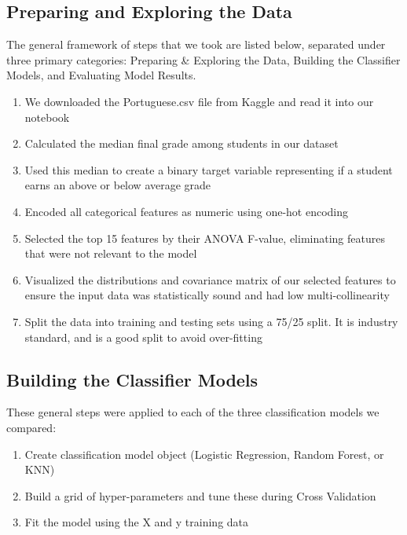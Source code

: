 \documentclass[twoside,twocolumn]{article}
\begin{document}
\subsection{Preparing and Exploring the Data}
The general framework of steps that we took are listed below, separated under three primary categories: Preparing \& Exploring the Data, Building the Classifier Models, and Evaluating Model Results. 
\begin{enumerate}
	\item We downloaded the Portuguese.csv file from Kaggle and read it into our notebook
	\item Calculated the median final grade among students in our dataset
	\item Used this median to create a binary target variable representing if a student earns an above or below average grade
	\item Encoded all categorical features as numeric using one-hot encoding 
	\item Selected the top 15 features by their ANOVA F-value, eliminating features that were not relevant to the model
	\item Visualized the distributions and covariance matrix of our selected features to ensure the input data was statistically sound and had low multi-collinearity
	\item Split the data into training and testing sets using a 75/25 split. It is industry standard, and is a good split to avoid over-fitting
\end{enumerate}

\subsection{Building the Classifier Models}
These general steps were applied to each of the three classification models we compared:
\begin{enumerate}
	\item Create classification model object (Logistic Regression, Random Forest, or KNN)
	\item Build a grid of hyper-parameters and tune these during Cross Validation
	\item Fit the model using the X and y training data
\end {enumerate}
\end{document}
